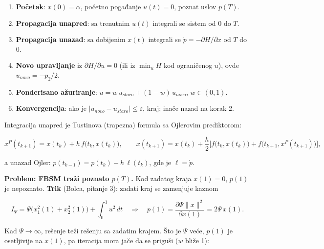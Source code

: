\documentclass[11pt,a4paper,parskip=half,headsepline,numbers=noenddot]{scrartcl}
\begin{document}
\begin{enumerate}
\def\labelenumi{\arabic{enumi}.}
\item \textbf{Početak}: \(x(0) = \alpha\), početno pogađanje \(u(t) = 0\), poznat uslov \(p(T)\).
\item \textbf{Propagacija unapred}: sa trenutnim \(u(t)\) integrali se sistem od \(0\) do \(T\).
\item \textbf{Propagacija unazad}: sa dobijenim \(x(t)\) integrali se \(\dot p = -\partial H/\partial x\) od \(T\) do \(0\).
\item \textbf{Novo upravljanje} iz \(\partial H/\partial u = 0\) (ili iz \(\min_u H\) kod ograničenog \(u\)), ovde \(u_{novo} = -p_2/2\).
\item \textbf{Ponderisano ažuriranje}: \(u = w\,u_{staro} + (1 - w)\,u_{novo}\), \(w \in (0, 1)\).
\item \textbf{Konvergencija}: ako je \(|u_{novo} - u_{staro}| \le \varepsilon\), kraj; inače nazad na korak 2.
\end{enumerate}

Integracija unapred je Tustinova (trapezna) formula sa Ojlerovim prediktorom:

\[x^P(t_{k+1}) = x(t_k) + h\,f\big(t_k, x(t_k)\big), \qquad x(t_{k+1}) = x(t_k) + \frac h2\Big[f\big(t_k, x(t_k)\big) + f\big(t_{k+1}, x^P(t_{k+1})\big)\Big],\]

a unazad Ojler: \(p(t_{k-1}) = p(t_k) - h\,\ell(t_k)\), gde je \(\ell = \dot p\).

\textbf{Problem: FBSM traži poznato \(p(T)\).} Kod zadatog kraja \(x(1) = 0\), \(p(1)\) je nepoznato. \textbf{Trik} (Bolca, pitanje 3): zadati kraj se zamenjuje kaznom

\[I_\Psi = \Psi\big(x_1^2(1) + x_2^2(1)\big) + \int_0^1u^2\,dt \quad\Rightarrow\quad p(1) = \frac{\partial\Psi\|x\|^2}{\partial x(1)} = 2\Psi\,x(1) .\]

Kad \(\Psi \to \infty\), rešenje teži rešenju sa zadatim krajem. Što je \(\Psi\) veće, \(p(1)\) je osetljivije na \(x(1)\), pa iteracija mora jače da se priguši (\(w\) bliže 1):
\end{document}
